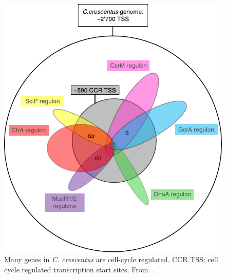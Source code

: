 \begin{figure}
    \centering
    \includegraphics{cell-cycle-genes}
    \caption{
        Many genes in \textit{C. crescentus} are cell-cycle regulated.
        CCR TSS: cell cycle regulated transcription start sites.
        From~\cite{collier2016}.
        \label{fig:cell-cycle-genes}
     }
\end{figure}
    
